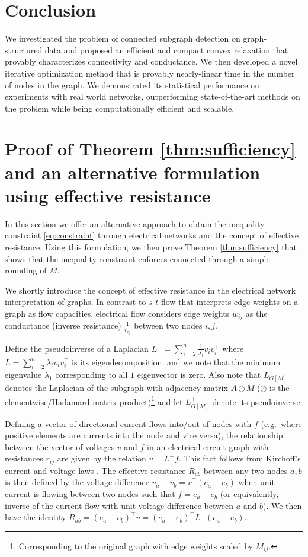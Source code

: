 \documentclass{article}
\begin{document}
\section{Conclusion}

We investigated the problem of connected subgraph detection on graph-structured data and proposed an efficient and compact convex relaxation that provably characterizes connectivity and conductance. We then developed a novel iterative optimization method that is provably nearly-linear time in the number of nodes in the graph. We demonstrated its statistical performance on experiments with real world networks, outperforming state-of-the-art methods on the problem while being computationally efficient and scalable.


\vfill
\pagebreak

\appendix
\appendixpage

\section{Proof of Theorem \ref{thm:sufficiency} and an alternative formulation using effective resistance}

In this section we offer an alternative approach to obtain the inequality constraint \eqref{eq:constraint} through electrical networks and the concept of effective resistance. Using this formulation, we then prove Theorem \ref{thm:sufficiency} that shows that the inequality constraint enforces connected through a simple rounding of $M$.

We shortly introduce the concept of effective resistance in the electrical network interpretation of graphs. In contrast to $s$-$t$ flow that interprets edge weights on a graph as flow capacities, electrical flow considers edge weights $w_{ij}$ as the conductance (inverse resistance) $\frac{1}{r_{ij}}$ between two nodes $i,j$.

Define the pseudoinverse of a Laplacian $L^+ = \sum_{i=2}^n \frac{1}{\lambda_i} v_i v_i^\top$ where $L = \sum_{i=2}^n \lambda_i v_i v_i^\top$ is its eigendecomposition, and we note that the minimum eigenvalue $\lambda_1$ corresponding to all $1$ eigenvector is zero. Also note that $L_{G[M]}$ denotes the Laplacian of the subgraph with adjacency matrix $A \odot M$ ($\odot$ is the elementwise/Hadamard matrix product)\footnote{Corresponding to the original graph with edge weights scaled by $M_{ij}$.} and let $L^+_{G[M]}$ denote its pseudoinverse.

Defining a vector of directional current flows into/out of nodes with $f$ (e.g.\ where positive elements are currents into the node and vice versa), the relationship between the vector of voltages $v$ and $f$ in an electrical circuit graph with resistances $r_{ij}$ are given by the relation $v = L^+ f$. This fact follows from Kirchoff's current and voltage laws \cite{Lxb}.
The effective resistance $R_{ab}$ between any two nodes $a, b$ is then defined by the voltage difference $v_a - v_b = v^\top (e_a - e_b)$ when unit current is flowing between two nodes such that $f = e_a - e_b$ (or equivalently, inverse of the current flow with unit voltage difference between $a$ and $b$). We then have the identity $R_{ab} = (e_a - e_b)^\top v = (e_a - e_b)^\top L^+ (e_a - e_b)$.
\end{document}
